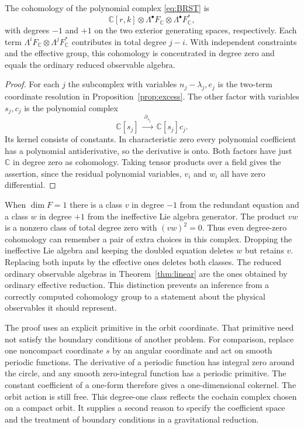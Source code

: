 \documentclass[11pt,letterpaper]{article}
\newcommand{\CC}{\mathbb C}
\begin{document}
\begin{proposition}\label{prop:ce}
The cohomology of the polynomial complex \eqref{eq:BRST} is
\[
 \CC[r,k]\otimes
 \Lambda^\bullet F_{\CC}\otimes
 \Lambda^\bullet F_{\CC}^*,
\]
with degrees $-1$ and $+1$ on the two exterior generating spaces, respectively. Each term
$\Lambda^i F_{\CC}\otimes\Lambda^j F_{\CC}^*$ contributes in total degree $j-i$. With
independent constraints and the effective group, this cohomology is concentrated in degree
zero and equals the ordinary reduced observable algebra.
\end{proposition}
\begin{proof}
For each $j$ the subcomplex with variables $n_j-\lambda_j,e_j$ is the two-term coordinate
resolution in Proposition~\ref{prop:excess}. The other factor with variables $s_j,c_j$ is the
polynomial complex
\[
 \CC[s_j]\ \xrightarrow{\ \partial_{s_j}\ }\ \CC[s_j]c_j .
\]
Its kernel consists of constants. In characteristic zero every polynomial coefficient has a
polynomial antiderivative, so the derivative is onto. Both factors have just $\CC$ in degree
zero as cohomology. Taking tensor products over a field gives the assertion, since the
residual polynomial variables, $v_i$ and $w_i$ all have zero differential.
\end{proof}

When $\dim F=1$ there is a class $v$ in degree $-1$ from the redundant equation and a class
$w$ in degree $+1$ from the ineffective Lie algebra generator. The product $vw$ is a nonzero
class of total degree zero with $(vw)^2=0$. Thus even degree-zero cohomology can remember a
pair of extra choices in this complex. Dropping the ineffective Lie algebra and keeping the
doubled equation deletes $w$ but retains $v$. Replacing both inputs by the effective ones
deletes both classes. The reduced ordinary observable algebras in Theorem~\ref{thm:linear} are
the ones obtained by ordinary effective reduction. This distinction prevents an inference from
a correctly computed cohomology group to a statement about the physical observables it should
represent.

The proof uses an explicit primitive in the orbit coordinate. That primitive need not satisfy
the boundary conditions of another problem. For comparison, replace one noncompact coordinate
$s$ by an angular coordinate and act on smooth periodic functions. The derivative of a
periodic function has integral zero around the circle, and any smooth zero-integral function
has a periodic primitive. The constant coefficient of a one-form therefore gives a
one-dimensional cokernel. The orbit action is still free. This degree-one class reflects the
cochain complex chosen on a compact orbit. It supplies a second reason to specify the
coefficient space and the treatment of boundary conditions in a gravitational reduction.
\end{document}
